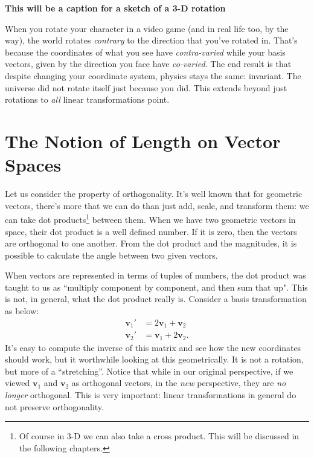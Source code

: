 	\textbf{This will be a caption for a sketch of a 3-D rotation}
	
	 When you rotate your character in a video game (and in real life too, by the way), the world rotates \emph{contrary} to the direction that you've rotated in. That's because the coordinates of what you see have \emph{contra-varied} while your basis vectors, given by the direction you face have \emph{co-varied}. The end result is that despite changing your coordinate system, physics stays the same: invariant. The universe did not rotate itself just because you did. This extends beyond just rotations to \emph{all} linear transformations point. \\
	
	
	\section{The Notion of Length on Vector Spaces} %
	\label{sec:the_notion_of_length_on_vector_spaces}
	
	Let us consider the property of orthogonality. It's well known that for geometric vectors, there's more that we can do than just add, scale, and transform them: we can take dot products\footnote{Of course in 3-D we can also take a cross product. This will be discussed in the following chapters.} between them. When we have two geometric vectors in space, their dot product is a well defined number. If it is zero, then the vectors are orthogonal to one another. From the dot product and the magnitudes, it is possible to calculate the angle between two given vectors. 
	
	When vectors are represented in terms of tuples of numbers, the dot product was taught to us as ``multiply component by component, and then sum that up". This is not, in general, what the dot product really is. Consider a basis transformation as below:
	\begin{align*}
		\mathbf v_1' &= 2 \mathbf v_1 + \mathbf v_2 \\
		\mathbf v_2' &=  \mathbf v_1 + 2 \mathbf v_2.
	\end{align*}
	It's easy to compute the inverse of this matrix and see how the new coordinates should work, but it worthwhile looking at this geometrically. It is not a rotation, but more of a ``stretching''. Notice that while in our original perspective, if we viewed $\mathbf v_1$ and $\mathbf v_2$ as orthogonal vectors, in the \emph{new} perspective, they are \emph{no longer} orthogonal. This is very important: linear transformations in general do not preserve orthogonality.
	
